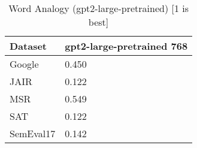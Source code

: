\begin{table}[]
\centering
\begin{tabular}{l|l}
\hline
Dataset & gpt2-large-pretrained 768 \\
\hline
Google & 0.450 \\ 
JAIR & 0.122 \\ 
MSR & 0.549 \\ 
SAT & 0.122 \\ 
SemEval17 & 0.142
\end{tabular}
\caption{Word Analogy (gpt2-large-pretrained) [1 is best]}
\label{tab:analogy-gpt2-large-pretrained}
\end{table}
